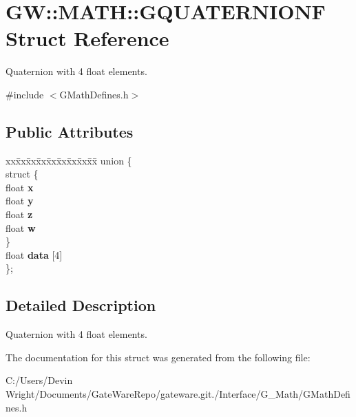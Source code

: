 \hypertarget{struct_g_w_1_1_m_a_t_h_1_1_g_q_u_a_t_e_r_n_i_o_n_f}{}\section{GW\+:\+:M\+A\+TH\+:\+:G\+Q\+U\+A\+T\+E\+R\+N\+I\+O\+NF Struct Reference}
\label{struct_g_w_1_1_m_a_t_h_1_1_g_q_u_a_t_e_r_n_i_o_n_f}


Quaternion with 4 float elements.  




{\ttfamily \#include $<$G\+Math\+Defines.\+h$>$}

\subsection*{Public Attributes}
\begin{DoxyCompactItemize}
\item 
\mbox{\label{struct_g_w_1_1_m_a_t_h_1_1_g_q_u_a_t_e_r_n_i_o_n_f_a7c2433cf1a05874f7171de87965d1430}} 
\begin{tabbing}
xx\=xx\=xx\=xx\=xx\=xx\=xx\=xx\=xx\=\kill
union \{\\
\mbox{\label{union_g_w_1_1_m_a_t_h_1_1_g_q_u_a_t_e_r_n_i_o_n_f_1_1_0D20_ae51a5baccd54f6515b443e64d7207045}} 
\>struct \{\\
\>\>float {\bfseries x}\\
\>\>float {\bfseries y}\\
\>\>float {\bfseries z}\\
\>\>float {\bfseries w}\\
\>\} \\
\>float {\bfseries data} \mbox{[}4\mbox{]}\\
\}; \\

\end{tabbing}\end{DoxyCompactItemize}


\subsection{Detailed Description}
Quaternion with 4 float elements. 

The documentation for this struct was generated from the following file\+:\begin{DoxyCompactItemize}
\item 
C\+:/\+Users/\+Devin Wright/\+Documents/\+Gate\+Ware\+Repo/gateware.\+git./\+Interface/\+G\+\_\+\+Math/G\+Math\+Defines.\+h\end{DoxyCompactItemize}
